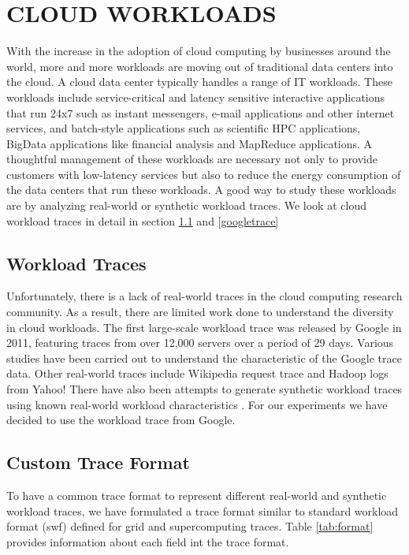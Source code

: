 \documentclass[letterpaper,twocolumn,12pt]{article}
\begin{document}
\fi





\section{CLOUD WORKLOADS } 
With the increase in the adoption of cloud computing by businesses around the world, more and more workloads are moving out of traditional data centers into the cloud. A cloud data center typically handles a range of IT workloads. These workloads include service-critical and latency sensitive interactive applications that run 24x7 such as instant messengers, e-mail applications and other internet services, and batch-style applications such as scientific HPC applications, BigData applications like financial analysis and MapReduce applications. A thoughtful management of these workloads are necessary not only to provide customers with low-latency services but also to reduce the energy consumption of the data centers that run these workloads. A good way to study these workloads are by analyzing real-world or synthetic workload traces. We look at cloud workload traces in detail in section \ref{traces} and \ref{googletrace}

\subsection{Workload Traces} \label{traces}
Unfortunately, there is a lack of real-world traces in the cloud computing research community. As a result, there are limited work done to understand the diversity in cloud workloads. The first large-scale workload trace was released by Google in 2011\cite{googletracedata}, featuring traces from over 12,000 servers over a period of 29 days. Various studies have been carried out to understand the characteristic of the Google trace data. Other real-world traces include Wikipedia request trace \cite{urdaneta2009wikipedia} and Hadoop logs from Yahoo! \cite{yahootrace}There have also been attempts to generate synthetic workload traces using known real-world workload characteristics \cite{beitch2010rain} \cite{wang2011towards}. For our experiments we have decided to use the workload trace from Google. 

\subsection{Custom Trace Format}
To have a common trace format to represent different real-world and synthetic workload traces, we have formulated a trace format similar to standard workload format (swf) \cite{chapin1999benchmarks} defined for grid and supercomputing traces. Table \ref{tab:format} provides information about each field int the trace format.
 
\end{document}
